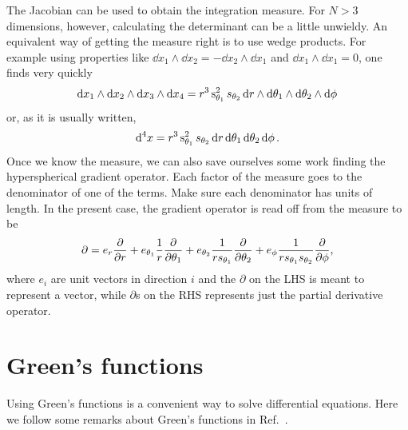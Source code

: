 The Jacobian can be used to obtain the integration measure. For $N>3$
dimensions, however, calculating the determinant can be a little
unwieldy. An equivalent way of getting the measure right is to
use wedge products. For example using properties like
$\dd{x_1}\wedge\dd{x_2}=-\dd{x_2}
  \wedge\dd{x_1}$ and $\dd{x_1}\wedge\dd{x_1}=0$, 
one finds very quickly
\begin{equation}
  \dd{x_1}\wedge\dd{x_2}\wedge\dd{x_3}\wedge\dd{x_4}
   =r^3\operatorname{s}_{\theta_1}^2s_{\theta_2} 
     \dd{r}\wedge\dd{\theta_1}\wedge\dd{\theta_2}\wedge\dd{\phi}
\end{equation}
or, as it is usually written,
\begin{equation}
  \dd[4]{x}=r^3\operatorname{s}_{\theta_1}^2s_{\theta_2}
             \dd{r}\dd{\theta_1}\dd{\theta_2}\dd{\phi}.
\end{equation}
Once we know the measure, we can also save ourselves some work
finding the hyperspherical gradient operator. Each factor of the
measure goes to the denominator of one of the terms. Make sure
each denominator has units of length. In the present case, the
gradient operator is read off from the measure to be
\begin{equation}\label{eq:4dgrad}
  \partial=e_r\pdv{r}
   +e_{\theta_1}\frac{1}{r}\pdv{\theta_1}
   +e_{\theta_2}\frac{1}{rs_{\theta_1}}\pdv{\theta_2}
   +e_\phi\frac{1}{rs_{\theta_1}s_{\theta_2}}\pdv{\phi},
\end{equation}
where $e_i$ are unit vectors in direction $i$ and the $\partial$ on
the LHS is meant to represent a vector, while $\partial$s on the RHS
represents just the partial derivative operator.





\section{Green's functions}
Using Green's functions is a convenient way to solve differential equations.
Here we follow some remarks about Green's functions in
Ref.~\cite{mccomb_renormalization_2004}.

